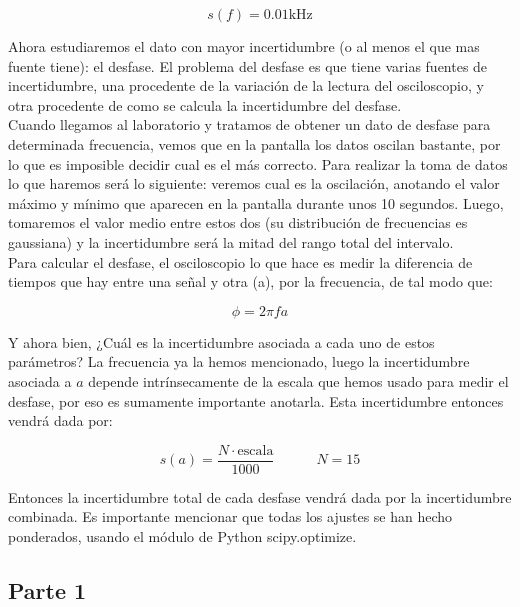 \documentclass[12pt,a4paper]{article}
\newcommand{\KHz}{\mathrm{kHz} }
\newcommand{\tquad}{\quad \quad \quad}
\begin{document}
\begin{equation}
s(f) = 0.01 \KHz
\end{equation}

Ahora estudiaremos el dato con mayor incertidumbre (o al menos el que mas fuente tiene): el desfase. El problema del desfase es que tiene varias fuentes de incertidumbre, una procedente de la variación de la lectura del osciloscopio, y otra procedente de como se calcula la incertidumbre del desfase. \\

Cuando llegamos al laboratorio y tratamos de obtener un dato de desfase para determinada frecuencia, vemos que en la pantalla los datos oscilan bastante, por lo que es imposible decidir cual es el más correcto. Para realizar la toma de datos lo que haremos será lo siguiente: veremos cual es la oscilación, anotando el valor máximo y mínimo que aparecen en la pantalla durante unos 10 segundos. Luego, tomaremos el valor medio entre estos dos (su distribución de frecuencias es gaussiana) y la incertidumbre será la mitad del rango total del intervalo. \\

Para calcular el desfase, el osciloscopio lo que hace es medir la diferencia de tiempos que hay entre una señal y otra (a), por la frecuencia, de tal modo que:

\begin{equation}
\phi = 2 \pi f a
\end{equation}

Y ahora bien, ¿Cuál es la incertidumbre asociada a cada uno de estos parámetros? La frecuencia ya la hemos mencionado, luego la incertidumbre asociada a $a$ depende intrínsecamente de la escala que hemos usado para medir el desfase, por eso es sumamente importante anotarla. Esta incertidumbre entonces vendrá dada por:

\begin{equation}
s(a) = \dfrac{N \cdot \mathrm{escala}}{1000} \tquad N = 15
\end{equation}

Entonces la incertidumbre total de cada desfase vendrá dada por la incertidumbre combinada. Es importante mencionar que todas los ajustes se han hecho ponderados, usando el módulo de Python scipy.optimize.

\subsection{Parte 1}
\end{document}
